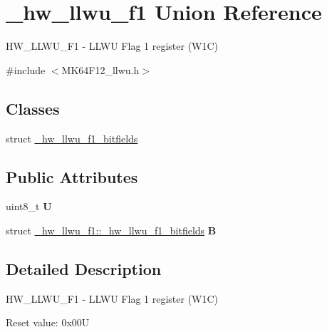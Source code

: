 \hypertarget{union__hw__llwu__f1}{}\section{\+\_\+hw\+\_\+llwu\+\_\+f1 Union Reference}
\label{union__hw__llwu__f1}


H\+W\+\_\+\+L\+L\+W\+U\+\_\+\+F1 -\/ L\+L\+WU Flag 1 register (W1C)  




{\ttfamily \#include $<$M\+K64\+F12\+\_\+llwu.\+h$>$}

\subsection*{Classes}
\begin{DoxyCompactItemize}
\item 
struct \hyperlink{struct__hw__llwu__f1_1_1__hw__llwu__f1__bitfields}{\+\_\+hw\+\_\+llwu\+\_\+f1\+\_\+bitfields}
\end{DoxyCompactItemize}
\subsection*{Public Attributes}
\begin{DoxyCompactItemize}
\item 
uint8\+\_\+t {\bfseries U}\hypertarget{union__hw__llwu__f1_afb7466030ba9804b88caf02023d7b731}{}\label{union__hw__llwu__f1_afb7466030ba9804b88caf02023d7b731}

\item 
struct \hyperlink{struct__hw__llwu__f1_1_1__hw__llwu__f1__bitfields}{\+\_\+hw\+\_\+llwu\+\_\+f1\+::\+\_\+hw\+\_\+llwu\+\_\+f1\+\_\+bitfields} {\bfseries B}\hypertarget{union__hw__llwu__f1_a97ca59cce7219d07f2af884d21a9ec6b}{}\label{union__hw__llwu__f1_a97ca59cce7219d07f2af884d21a9ec6b}

\end{DoxyCompactItemize}


\subsection{Detailed Description}
H\+W\+\_\+\+L\+L\+W\+U\+\_\+\+F1 -\/ L\+L\+WU Flag 1 register (W1C) 

Reset value\+: 0x00U

